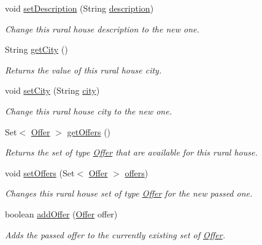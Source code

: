 \begin{DoxyCompactItemize}
void \mbox{\hyperlink{a00188_ad4e39275d6996833e089c2013bfb9c4b}{set\+Description}} (String \mbox{\hyperlink{a00188_a3cd460d3df936008a7c7580e87680fd4}{description}})
\begin{DoxyCompactList}\small\item\em Change this rural house description to the new one. \end{DoxyCompactList}\item 
String \mbox{\hyperlink{a00188_acb17324965fdc86c270d1b2dc7624083}{get\+City}} ()
\begin{DoxyCompactList}\small\item\em Returns the value of this rural house city. \end{DoxyCompactList}\item 
void \mbox{\hyperlink{a00188_a329be3e41ca6f9e57a0fc887c066ad55}{set\+City}} (String \mbox{\hyperlink{a00188_a495797ff9bd294c83563790e36ec2245}{city}})
\begin{DoxyCompactList}\small\item\em Change this rural house city to the new one. \end{DoxyCompactList}\item 
Set$<$ \mbox{\hyperlink{a00184}{Offer}} $>$ \mbox{\hyperlink{a00188_a8e5bd3ba4e562e0c1e57e762cdee9447}{get\+Offers}} ()
\begin{DoxyCompactList}\small\item\em Returns the set of type \mbox{\hyperlink{a00184}{Offer}} that are available for this rural house. \end{DoxyCompactList}\item 
void \mbox{\hyperlink{a00188_a6edffd501fd0be08f923be5a1615e1fb}{set\+Offers}} (Set$<$ \mbox{\hyperlink{a00184}{Offer}} $>$ \mbox{\hyperlink{a00188_a8e07bbd638166d5d9356828a4ce09488}{offers}})
\begin{DoxyCompactList}\small\item\em Changes this rural house set of type \mbox{\hyperlink{a00184}{Offer}} for the new passed one. \end{DoxyCompactList}\item 
boolean \mbox{\hyperlink{a00188_a42b59123f7f6ac871f5510bb19a98884}{add\+Offer}} (\mbox{\hyperlink{a00184}{Offer}} offer)
\begin{DoxyCompactList}\small\item\em Adds the passed offer to the currently existing set of \mbox{\hyperlink{a00184}{Offer}}. \end{DoxyCompactList}\item 

\end{DoxyCompactItemize}
